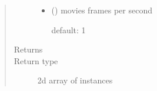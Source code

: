 \documentclass[letterpaper,10pt,openany,oneside,english]{sphinxmanual}
\begin{document}
\begin{fulllineitems}
\begin{quote}
\begin{description}
\begin{itemize}
\item {} 
 (\sphinxstyleliteralemphasis{, }) \textendash{} 
movies frames per second

default: 1


\end{itemize}

\item[{Returns}] \leavevmode
{}

\item[{Return type}] \leavevmode
2d array of  instances

\end{description}\end{quote}

\end{fulllineitems}

\end{document}
